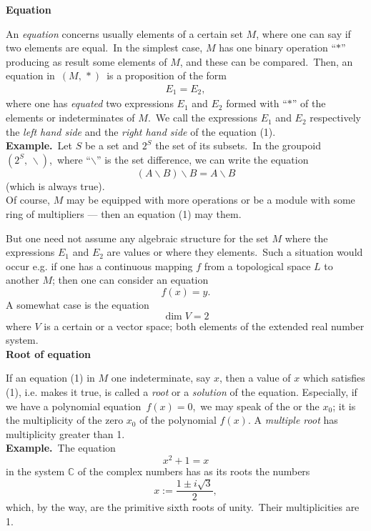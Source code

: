 \documentclass[12pt]{article}
\theoremstyle{definition}
\begin{document}
\textbf{Equation}

An {\em equation} concerns usually elements of a certain set $M$, where one can say if two elements are equal.\, In the simplest case, $M$ has one binary operation ``$*$'' producing as result some elements of $M$, and these can be compared.\, Then, an equation in\, $(M,\,*)$\, is a proposition of the form
\begin{align}
                             E_1 = E_2,
\end{align}
where one has {\em equated} two expressions $E_1$ and $E_2$ formed with ``$*$'' of the elements or indeterminates of $M$.\, We call the expressions $E_1$ and $E_2$ respectively the {\em left hand side} and the {\em right hand side} of the equation (1).\\

\textbf{Example.}\, Let $S$ be a set and $2^S$ the set of its subsets.\, In the groupoid\, $(2^S,\,\smallsetminus)$,\, where ``$\smallsetminus$'' is the set difference, we can write the equation
                $$(A\!\smallsetminus\!B)\!\smallsetminus\!B = A\!\smallsetminus\!B$$
(which is always true).\\

Of course, $M$ may be equipped with more operations or be a module with some ring of multipliers --- then an equation (1) may  them.

But one need not assume any algebraic structure for the set $M$ where the expressions $E_1$ and $E_2$ are values or where they  elements.\, Such a situation would occur e.g. if one has a continuous mapping $f$ from a topological space $L$ to another $M$; then one can consider an equation
$$f(x) = y.$$
A somewhat  case is the equation
$$\dim{V} = 2$$ 
where $V$ is a certain or a  vector space; both  elements of the extended real number system.\\

\textbf{Root of equation}

If an equation (1) in $M$  one indeterminate, say $x$, then a value of $x$ which satisfies (1), i.e. makes it true, is called a {\em root} or a {\em solution} of the equation.
Especially, if we have a polynomial equation\, $f(x) = 0$,\, we may speak of the  or the {\em {}} $x_0$; it is the multiplicity of the zero $x_0$ of the polynomial $f(x)$.  A {\em multiple root} has multiplicity greater than 1.\\

\textbf{Example.}\, The equation
                           $$x^2\!+\!1 = x$$
in the system $\mathbb{C}$ of the complex numbers has as its roots the numbers
      $$x := \frac{1\!\pm\!i\sqrt{3}}{2},$$
which, by the way, are the primitive sixth roots of unity.\, Their multiplicities are 1.
\end{document}
